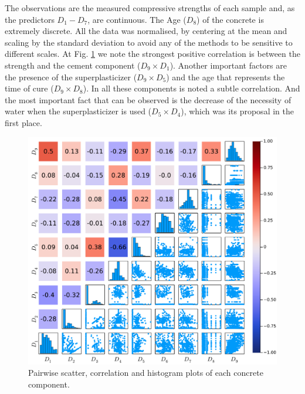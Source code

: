 \documentclass[conference]{IEEEtran}
\begin{document}
The observations are the measured compressive strengths of each sample and, as the predictors $D_1 - D_7$, are continuous. The Age ($D_8$) of the concrete is extremely discrete. All the data was normalised, by centering at the mean and scaling by the standard deviation to avoid any of the methods to be sensitive to different scales. At Fig. \ref{histogram_biplot} we note the strongest positive correlation is between the strength and the cement component ($D_9 \times D_1$). Another important factors are the presence of the superplasticizer ($D_9 \times D_5$) and the age that represents the time of cure ($D_9 \times D_8$). In all these components is noted a subtle correlation. And the most important fact that can be observed is the decrease of the necessity of water when the superplasticizer is used ($D_5 \times D_4$), which was its proposal in the first place.
\begin{figure}[htbp]
\centerline{\includegraphics[width=\columnwidth]{../figures/correlation_predictors_outcomes}}
\caption{Pairwise scatter, correlation and histogram plots of each concrete component.}
\label{histogram_biplot}
\end{figure}
\end{document}
